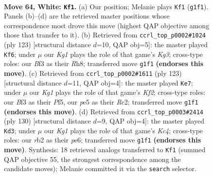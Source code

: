 \documentclass[11pt]{article}
\begin{document}
\clearpage

\begin{figure}[p]\centering
\begin{subfigure}{0.46\textwidth}\centering
\resizebox{\linewidth}{!}{%
\newchessgame
\chessboard[
  setfen={8/8/7k/4p1p1/5p2/5B2/1r6/6K1 w - - 39 64},
  showmover=false,
  pgfstyle=straightmove, color=movearrow, markmove={g1-f1}
]}
\caption{}
\end{subfigure}\hfill
\begin{subfigure}{0.46\textwidth}\centering
\resizebox{\linewidth}{!}{%
\newchessgame
\chessboard[
  setfen={7r/3R4/6k1/8/5p2/5P2/6P1/6K1 b - - 8 62},
  showmover=false,
  pgfstyle=straightmove, color=movearrow, markmove={g6-f6}
]}
\caption{}
\end{subfigure}
\\[4pt]
\begin{subfigure}{0.46\textwidth}\centering
\resizebox{\linewidth}{!}{%
\newchessgame
\chessboard[
  setfen={8/5k2/1R6/5p2/5P2/6PK/2r5/8 b - - 0 62},
  showmover=false,
  pgfstyle=straightmove, color=movearrow, markmove={f7-e7}
]}
\caption{}
\end{subfigure}\hfill
\begin{subfigure}{0.46\textwidth}\centering
\resizebox{\linewidth}{!}{%
\newchessgame
\chessboard[
  setfen={8/8/2B1p3/8/P1K2kp1/7p/8/8 w - - 0 66},
  showmover=false,
  pgfstyle=straightmove, color=movearrow, markmove={c4-d3}
]}
\caption{}
\end{subfigure}
\caption{\textbf{Move 64, White: \texttt{Kf1}.} (a) Our position; Melanie plays \texttt{Kf1} (\texttt{g1f1}). Panels (b)--(d) are the retrieved master positions whose correspondence most drove this move (highest QAP objective among those that transfer to it). (b) Retrieved from \texttt{ccrl\_top\_p0002\#1024} (ply 123) [structural distance $d$=10, QAP obj=5]: the master played \texttt{Kf6}; under $\mu$ our \emph{Kg1} plays the role of that game's \emph{Kg3}; cross-type roles: our \emph{B}f3 as their \emph{R}h8; transferred move \texttt{g1f1} \textbf{(endorses this move)}. (c) Retrieved from \texttt{ccrl\_top\_p0002\#1611} (ply 123) [structural distance $d$=11, QAP obj=4]: the master played \texttt{Ke7}; under $\mu$ our \emph{Kg1} plays the role of that game's \emph{Kf2}; cross-type roles: our \emph{B}f3 as their \emph{P}f5, our \emph{p}e5 as their \emph{R}c2; transferred move \texttt{g1f1} \textbf{(endorses this move)}. (d) Retrieved from \texttt{ccrl\_top\_p0003\#2414} (ply 130) [structural distance $d$=9, QAP obj=4]: the master played \texttt{Kd3}; under $\mu$ our \emph{Kg1} plays the role of that game's \emph{Kc4}; cross-type roles: our \emph{r}b2 as their \emph{p}e6; transferred move \texttt{g1f1} \textbf{(endorses this move)}. Synthesis: 18 retrieved analogs transferred to \texttt{Kf1} (summed QAP objective 55, the strongest correspondence among the candidate moves); Melanie committed it via the \texttt{search} selector.}
\label{fig:thought-m126}
\end{figure}
\end{document}
